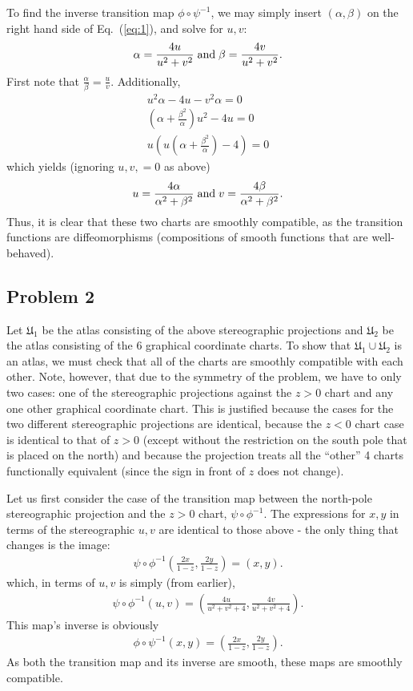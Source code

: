 \documentclass{mathnotes}
\begin{document}
To find the inverse transition map $\phi\circ\psi^{-1}$, we may simply insert $(\alpha,\beta)$ on the right hand side of Eq.~(\ref{eq:1}), and
solve for $u, v$:
\begin{align*}
    \alpha=\frac{4u}{u^2+v^2} \;\textnormal{and}\; \beta=\frac{4v}{u^2+v^2}.
\end{align*}
First note that $\frac{\alpha}{\beta}=\frac{u}{v}$. Additionally,
\begin{align*}
    u^2\alpha-4u-v^2\alpha=0\\
    \left( \alpha+\frac{\beta^2}{\alpha} \right)u^2-4u=0\\
    u\left( u(\alpha+\frac{\beta^2}{\alpha})-4 \right)=0
\end{align*}
which yields (ignoring $u,v,=0$ as above)
\begin{align*}
    u=\frac{4\alpha}{\alpha^2+\beta^2} \;\textnormal{and}\; v=\frac{4\beta}{\alpha^2+\beta^2}.
\end{align*}
Thus, it is clear that these two charts are smoothly compatible, as the transition functions are diffeomorphisms (compositions of smooth functions that are well-behaved).

\subsection*{Problem 2}

Let $\mathfrak{U}_1$ be the atlas consisting of the above stereographic projections and $\mathfrak{U}_2$ be the atlas consisting of the 6
graphical coordinate charts. To show that $\mathfrak{U}_1\cup\mathfrak{U}_2$ is an atlas, we must check that all of the charts are smoothly compatible with each other.
Note, however, that due to the symmetry of the problem, we have to only two cases: one of the stereographic projections against the $z>0$ chart and any one other
graphical coordinate chart. This is justified because the cases for the two different stereographic projections are identical, because the $z<0$ chart case is identical
to that of $z>0$ (except without the restriction on the south pole that is placed on the north) and because the projection treats
all the ``other'' 4 charts functionally equivalent (since the sign in front of $z$ does not change). 

Let us first consider the case of the transition map between the north-pole stereographic projection and the $z>0$ chart, $\psi\circ\phi^{-1}$. The expressions
for $x,y$ in terms of the stereographic $u,v$ are identical to those above - the only thing that changes is the image:
\begin{align*}
    \psi\circ\phi^{-1}\left( \frac{2x}{1-z},\frac{2y}{1-z} \right)= (x,y).
\end{align*}
which, in terms of $u,v$ is simply (from earlier),
\begin{align*}
    \psi\circ\phi^{-1}\left( u,v \right)=\left(\frac{4u}{u^2+v^2+4},\frac{4v}{u^2+v^2+4}\right).
\end{align*}
This map's inverse is obviously
\begin{align*}
    \phi\circ\psi^{-1}\left( x,y \right)=\left( \frac{2x}{1-z},\frac{2y}{1-z} \right).
\end{align*}
As both the transition map and its inverse are smooth, these maps are smoothly compatible.
\end{document}
